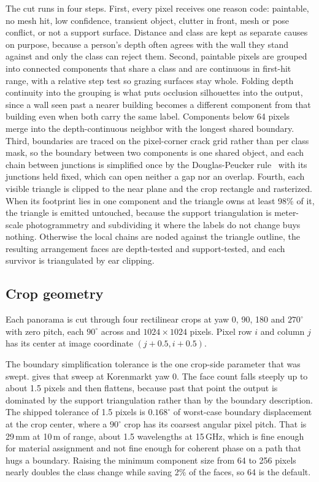 \documentclass[journal]{IEEEtran}
\begin{document}
The cut runs in four steps. First, every pixel receives one reason code:
paintable, no mesh hit, low confidence, transient object, clutter in front, mesh
or pose conflict, or not a support surface. Distance and class are kept as
separate causes on purpose, because a person's depth often agrees with the wall
they stand against and only the class can reject them. Second, paintable pixels
are grouped into connected components that share a class and are continuous in
first-hit range, with a relative step test so grazing surfaces stay whole.
Folding depth continuity into the grouping is what puts occlusion silhouettes
into the output, since a wall seen past a nearer building becomes a different
component from that building even when both carry the same label. Components
below 64 pixels merge into the depth-continuous neighbor with the longest shared
boundary. Third, boundaries are traced on the pixel-corner crack grid rather
than per class mask, so the boundary between two components is one shared
object, and each chain between junctions is simplified once by the
Douglas-Peucker rule~\cite{douglas} with its junctions held fixed, which can
open neither a gap nor an overlap. Fourth, each visible triangle is clipped to
the near plane and the crop rectangle and rasterized. When its footprint lies in
one component and the triangle owns at least 98\% of it, the triangle is emitted
untouched, because the support triangulation is meter-scale photogrammetry and
subdividing it where the labels do not change buys nothing. Otherwise the local
chains are noded against the triangle outline, the resulting arrangement faces
are depth-tested and support-tested, and each survivor is triangulated by ear
clipping.

\subsection{Crop geometry}

Each panorama is cut through four rectilinear crops at yaw 0, 90, 180 and
$270^\circ$ with zero pitch, each $90^\circ$ across and $1024 \times 1024$
pixels. Pixel row $i$ and column $j$ has its center at image coordinate
$(j + 0.5, i + 0.5)$.

The boundary simplification tolerance is the one crop-side parameter that was
swept.  gives that sweep at Korenmarkt yaw 0. The face
count falls steeply up to about 1.5 pixels and then flattens, because past that
point the output is dominated by the support triangulation rather than by the
boundary description. The shipped tolerance of 1.5 pixels is $0.168^\circ$ of
worst-case boundary displacement at the crop center, where a $90^\circ$ crop has
its coarsest angular pixel pitch. That is 29\,mm at 10\,m of range, about 1.5
wavelengths at 15\,GHz, which is fine enough for material assignment and not
fine enough for coherent phase on a path that hugs a boundary. Raising the
minimum component size from 64 to 256 pixels nearly doubles the class change
while saving 2\% of the faces, so 64 is the default.
\end{document}
